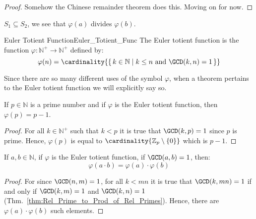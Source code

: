 \documentclass{article}                                                        %
\begin{document}
            \begin{proof}
                Somehow the Chinese remainder theorem does this. Moving on for
                now.
            \end{proof}
            $S_{1}\subseteq{S}_{2}$, we see that
            $\varphi(a)$ divides $\varphi(b)$.  \begin{fdefinition}{Euler Totient Function}{Euler_Totient_Func}
                The Euler totient function is the function
                $\varphi:\mathbb{N}^{+}\rightarrow\mathbb{N}^{+}$ defined by:
                \begin{equation*}
                    \varphi(n)=\cardinality{\{\,k\in\mathbb{N}\;|\;
                        k\leq{n}\textrm{ and }\GCD(k,n)=1\,\}}
                \end{equation*}
            \end{fdefinition}
            Since there are so many different uses of the symbol $\varphi$, when
            a theorem pertains to the Euler totient function we will explicitly
            say so.
            \begin{theorem}
                \label{thm:Euler_Totient_of_Prime}%
                If $p\in\mathbb{N}$ is a prime number and if $\varphi$ is the
                Euler totient function, then $\varphi(p)=p-1$.
            \end{theorem}
            \begin{proof}
                For all $k\in\mathbb{N}^{+}$ such that $k<p$ it is true that
                $\GCD(k,p)=1$ since $p$ is prime. Hence, $\varphi(p)$ is equal
                to $\cardinality{\mathbb{Z}_{p}\setminus\{0\}}$ which  is $p-1$.
            \end{proof}
            \begin{theorem}
                \label{thm:Euler_Totient_Multiplicative}%
                If $a,b\in\mathbb{N}$, if $\varphi$ is the Euler totient
                function, if $\GCD(a,b)=1$, then:
                \begin{equation}
                    \varphi(a\cdot{b})=\varphi(a)\cdot\varphi(b)
                \end{equation}
            \end{theorem}
            \begin{proof}
                For since $\GCD(n,m)=1$, for all $k<mn$ it is true that
                $\GCD(k,mn)=1$ if and only if $\GCD(k,m)=1$ and $\GCD(k,n)=1$
                (Thm.~\ref{thm:Rel_Prime_to_Prod_of_Rel_Primes}). Hence, there
                are $\varphi(a)\cdot\varphi(b)$ such elements.
            \end{proof}
\end{document}
